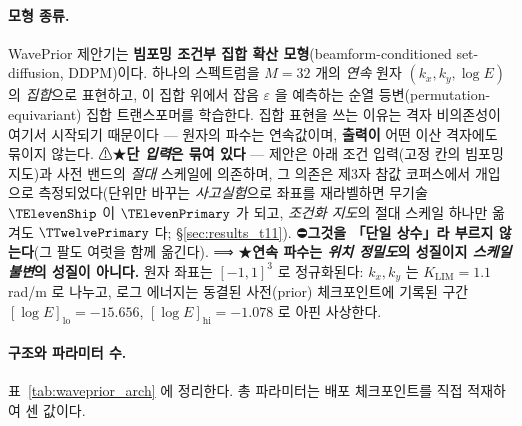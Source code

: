 \documentclass[11pt]{report}
\numberwithin{equation}{chapter}
\numberwithin{figure}{chapter}
\numberwithin{table}{chapter}
\begin{document}
\paragraph{모형 종류.}
WavePrior 제안기는 \textbf{빔포밍 조건부 집합 확산 모형}(beamform-conditioned set-diffusion,
DDPM)이다. 하나의 스펙트럼을 $M = 32$ 개의 \emph{연속} 원자
$(k_x, k_y, \log E)$ 의 \emph{집합}으로 표현하고, 이 집합 위에서 잡음 $\varepsilon$ 을
예측하는 순열 등변(permutation-equivariant) 집합 트랜스포머를 학습한다.
집합 표현을 쓰는 이유는 격자 비의존성이 여기서 시작되기 때문이다 --- 원자의 파수는
연속값이며, \textbf{출력이} 어떤 이산 격자에도 묶이지 않는다.
⚠★\textbf{단 \emph{입력}은 묶여 있다} --- 제안은 아래 조건 입력(고정 칸의 빔포밍 지도)과
사전 밴드의 \emph{절대} 스케일에 의존하며, 그 의존은 제3자 참값 코퍼스에서 개입으로
측정되었다(단위만 바꾸는 \emph{사고실험}으로 좌표를 재라벨하면 무기술 $\TElevenShip$ 이
$\TElevenPrimary$ 가 되고, \emph{조건화 지도}의 절대 스케일 하나만 옮겨도 $\TTwelvePrimary$ 다;
\S\ref{sec:results_t11}). ⛔\textbf{그것을 「단일 상수」라 부르지 않는다}(그 팔도 여럿을
함께 옮긴다). ⟹ ★\textbf{연속 파수는 \emph{위치 정밀도}의 성질이지 \emph{스케일 불변}의
성질이 아니다.}
원자 좌표는 $[-1,1]^3$ 로 정규화된다: $k_x, k_y$ 는
$K_{\text{LIM}} = 1.1$\,rad/m 로 나누고, 로그 에너지는 동결된 사전(prior) 체크포인트에
기록된 구간 $[\log E]_{\text{lo}} = -15.656$, $[\log E]_{\text{hi}} = -1.078$ 로
아핀 사상한다.

\paragraph{구조와 파라미터 수.}
표~\ref{tab:waveprior_arch} 에 정리한다. 총 파라미터는 배포 체크포인트를 직접 적재하여
센 값이다.
\end{document}
